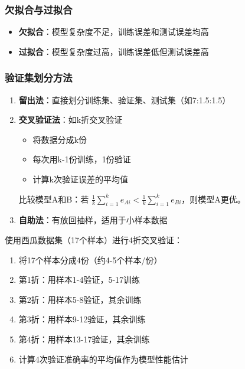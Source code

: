 \documentclass[12pt,a4paper]{ctexart}
\begin{document}
\subsubsection{欠拟合与过拟合}

\begin{notebox}[关键矛盾]
\begin{itemize}
    \item \textbf{欠拟合}：模型复杂度不足，训练误差和测试误差均高
    \item \textbf{过拟合}：模型复杂度过高，训练误差低但测试误差高
\end{itemize}
\end{notebox}

\subsubsection{验证集划分方法}

\begin{enumerate}
    \item \textbf{留出法}：直接划分训练集、验证集、测试集（如7:1.5:1.5）
    
    \item \textbf{交叉验证法}：如k折交叉验证
    \begin{itemize}
        \item 将数据分成k份
        \item 每次用k-1份训练，1份验证
        \item 计算k次验证误差的平均值
    \end{itemize}
    
    比较模型A和B：若 $\frac{1}{k}\sum_{i=1}^{k}e_{Ai} < \frac{1}{k}\sum_{i=1}^{k}e_{Bi}$，则模型A更优。
    
    \item \textbf{自助法}：有放回抽样，适用于小样本数据
\end{enumerate}


\begin{examplebox}
使用西瓜数据集（17个样本）进行4折交叉验证：
\begin{enumerate}
    \item 将17个样本分成4份（约4-5个样本/份）
    \item 第1折：用样本1-4验证，5-17训练
    \item 第2折：用样本5-8验证，其余训练
    \item 第3折：用样本9-12验证，其余训练
    \item 第4折：用样本13-17验证，其余训练
    \item 计算4次验证准确率的平均值作为模型性能估计
\end{enumerate}
\end{examplebox}
\end{document}

